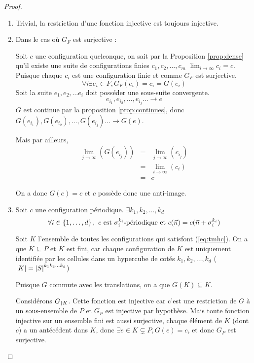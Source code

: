 \begin{proof}
	\begin{enumerate}
		\item Trivial, la restriction d'une fonction injective est toujours injective.
		\item Dans le cas où $G_F$ est surjective :

		      Soit $c$ une configuration quelconque, on sait par la Proposition \ref{prop:dense} qu'il existe
		      une suite de configurations finies $c_1, c_2, \ldots , c_m$ \tlq $\lim_{i \to \infty} c_i = c$.
		      Puisque chaque $c_i$ est une configuration finie et comme $G_F$ est surjective,
		      $$\forall i \exists e_i \in F, G_F(e_i) = c_i = G(e_i)$$
		      Soit la suite $e_1, e_2, \ldots e_i$  doit posséder une sous-suite convergente.
		      $$ e_{i_1}, e_{i_2}, \ldots , e_{i_j} \ldots \to e $$
		      $G$ est continue par la proposition \ref{prop:continues}, donc
		      $G(e_{i_1}), G(e_{i_2}), \ldots , G(e_{i_j}) \ldots  \to G(e)$.

		      Mais par ailleurs,
		      \begin{eqnarray*}
			      \lim_{j \to \infty} (G(e_{i_j})) &=& \lim_{j \to \infty} (c_{i_j}) \\
			      &=& \lim_{i \to \infty} (c_i) \\
			      &=& c
		      \end{eqnarray*}

		      On a donc $G(e) = c$ et $c$ possède donc une anti-image.
		\item Soit $c$ une configuration périodique.
		      $\exists k_1, k_2, \ldots, k_d$ \tlq
		      \begin{equation}
			      \forall i \in \left\{1,\ldots,d\right\}, \ c \text{ est }\sigma_i^{k_i}\text{-périodique} \text{ et }
			      c(\vec n) = c(\vec n + \sigma_i^{k_i})
			      \label{eq:tmhc}
		      \end{equation}

		      Soit $K$ l'ensemble de toutes les configurations qui satisfont (\ref{eq:tmhc}). On a que $K \subseteq P$ et $K$ est fini,
		      car chaque configuration de $K$ est uniquement identifiée par les cellules dans un hypercube de cotés $k_1, k_2, \ldots, k_d$
		      ($\left|K\right| = {\left|S\right|}^{k_1k_2\ldots k_d}$)

		      Puisque $G$ commute avec les translations, on a que $G(K) \subseteq K$.

		      Considérons $G_{\restriction K}$. Cette fonction est injective car c'est une restriction de $G$ à un
		      sous-ensemble de $P$ et $G_P$ est injective par hypothèse.
		      Mais toute fonction injective sur un ensemble fini est aussi surjective,
		      \cad chaque élément de $K$ (dont $c$) a un antécédent dans $K$,
		      donc $\exists e \in K \subsetneq P, G(e) = c$, et donc $G_P$ est surjective.
	\end{enumerate}
\end{proof}

